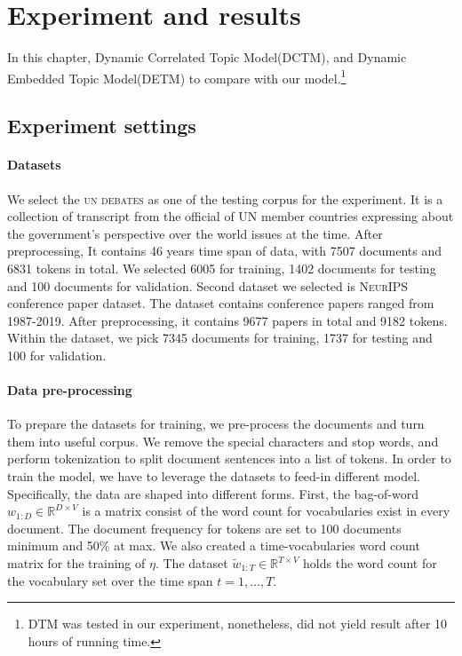\section{Experiment and results}
In this chapter, Dynamic Correlated Topic Model(DCTM)\cite{tomasi_stochastic_2020}, and Dynamic Embedded Topic Model(DETM)\cite{dieng_dynamic_2019} to compare with our model.\footnote{DTM was tested in our experiment, nonetheless, did not yield result after 10 hours of running time.}
\subsection{Experiment settings}
\paragraph{Datasets}
We select the \textsc{un debates} as one of the testing corpus for the experiment. It is a collection of transcript from the official of UN member countries expressing about the  government's perspective over the world issues at the time.
After preprocessing, It contains 46 years time span of data, with 7507 documents and 6831 tokens in total. We selected 6005 for training, 1402 documents for testing and 100 documents for validation.
Second dataset we selected is \textsc{NeurIPS} conference paper dataset. The dataset contains conference papers ranged from 1987-2019. After preprocessing, it contains 9677 papers in total and 9182 tokens. Within the dataset, we pick 7345 documents for training, 1737 for testing and 100 for validation.
\paragraph{Data pre-processing}
To prepare the datasets for training, we pre-process the documents and turn them into useful corpus.
We remove the special characters and stop words, and perform tokenization to split document sentences into a list of tokens. 
In order to train the model, we have to leverage the datasets to feed-in different model. Specifically, the data are shaped into different forms.
First, the bag-of-word $ w_{1:D}\in\mathbb{R}^{D\times V} $ is a matrix consist of the word count for vocabularies exist in every document. The document frequency for tokens are set to 100 documents minimum and 50\% at max.
We also created a time-vocabularies word count matrix for the training of $ \eta $. The dataset $ \tilde{w}_{1:T}\in\mathbb{R}^{T\times V} $ holds the word count for the vocabulary set over the time span $ t=1,\dots,T $.
